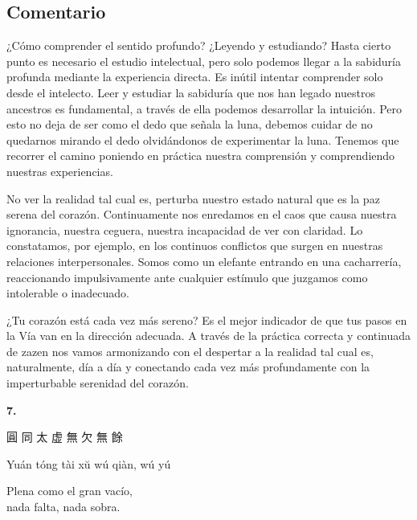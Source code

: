 \documentclass[
  a5paperpaper,
]{article}
\begin{document}
\hfill\break

\hypertarget{comentario-5}{%
\subsection{Comentario}\label{comentario-5}}

¿Cómo comprender el sentido profundo? ¿Leyendo y estudiando? Hasta
cierto punto es necesario el estudio intelectual, pero solo podemos
llegar a la sabiduría profunda mediante la experiencia directa. Es
inútil intentar comprender solo desde el intelecto. Leer y estudiar la
sabiduría que nos han legado nuestros ancestros es fundamental, a través
de ella podemos desarrollar la intuición. Pero esto no deja de ser como
el dedo que señala la luna, debemos cuidar de no quedarnos mirando el
dedo olvidándonos de experimentar la luna. Tenemos que recorrer el
camino poniendo en práctica nuestra comprensión y comprendiendo nuestras
experiencias.

No ver la realidad tal cual es, perturba nuestro estado natural que es
la paz serena del corazón. Continuamente nos enredamos en el caos que
causa nuestra ignorancia, nuestra ceguera, nuestra incapacidad de ver
con claridad. Lo constatamos, por ejemplo, en los continuos conflictos
que surgen en nuestras relaciones interpersonales. Somos como un
elefante entrando en una cacharrería, reaccionando impulsivamente ante
cualquier estímulo que juzgamos como intolerable o inadecuado.

¿Tu corazón está cada vez más sereno? Es el mejor indicador de que tus
pasos en la Vía van en la dirección adecuada. A través de la práctica
correcta y continuada de zazen nos vamos armonizando con el despertar a
la realidad tal cual es, naturalmente, día a día y conectando cada vez
más profundamente con la imperturbable serenidad del corazón.

\hfill\break

\hypertarget{02}{}
\begin{verseblock}

\newpage

\begin{center}\textbf{7.}\end{center}

圓 同 太 虚 無 欠 無 餘

Yuán tóng tài xŭ wú qiàn, wú yú

Plena como el gran vacío,\\
nada falta, nada sobra.

\end{verseblock}
\end{document}
